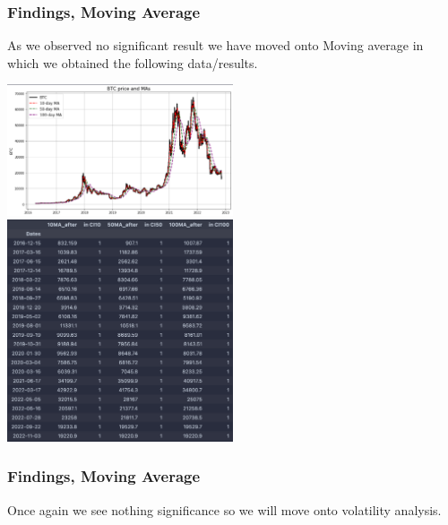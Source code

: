 \documentclass{beamer}
\begin{document}
\begin{frame}
    \frametitle{Findings, Moving Average}
As we observed no significant result we have moved onto Moving average in which we obtained the following data/results.
\begin{center}
  \includegraphics[width=0.5\textwidth]{research_project/text/paper/2.png}
\includegraphics[width=0.5\textwidth]{research_project/text/paper/3.png}  
\end{center}
\end{frame}

\begin{frame}
    \frametitle{Findings, Moving Average}
Once again we see nothing significance so we will move onto volatility analysis.
\end{frame}
\end{document}
